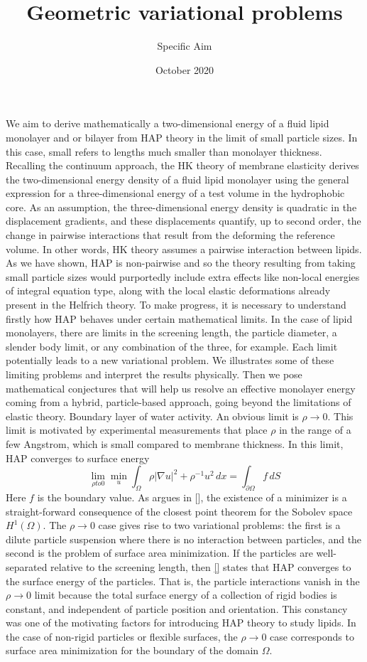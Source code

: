 \documentclass[12pt]{article}
\title{Geometric variational problems}
\author{Specific Aim}
\date{October 2020}
\begin{document}
\maketitle

We aim to derive mathematically a two-dimensional energy of a fluid lipid monolayer and or bilayer from HAP theory in the limit of small particle sizes. In this case, small refers to lengths much smaller than monolayer thickness. Recalling the continuum approach, the HK theory of membrane elasticity derives the two-dimensional energy density of a fluid lipid monolayer using the general expression for a three-dimensional energy of a test volume in the hydrophobic core. As an assumption, the three-dimensional energy density is quadratic in the displacement gradients, and these displacements quantify, up to second order, the change in pairwise interactions that result from the deforming the reference volume. In other words, HK theory assumes a pairwise interaction between lipids. As we have shown, HAP is non-pairwise and so the theory resulting from taking small particle sizes would purportedly include extra effects like non-local energies of integral equation type, along with the local elastic deformations already present in the Helfrich theory. 
To make progress, it is necessary to understand firstly how HAP behaves under certain mathematical limits. In the case of lipid monolayers, there are limits in the screening length, the particle diameter, a slender body limit, or any combination of the three, for example. Each limit potentially leads to a new variational problem. We illustrates some of these limiting problems and interpret the results physically. Then we pose mathematical conjectures that will help us resolve an effective monolayer energy coming from a hybrid, particle-based approach, going beyond the limitations of elastic theory.
Boundary layer of water activity. An obvious limit is $\rho \to 0$. This limit is motivated by experimental measurements that place $\rho$ in the range of a few Angstrom, which is small compared to membrane thickness. In this limit, HAP converges to surface energy 
\begin{equation}
\lim_{\rho to 0} \min_u \int_{\Omega} \rho |\nabla u|^2 + \rho^{-1} u^2 \,dx = \int_{\partial \Omega} f \,dS 
\end{equation}
Here $f$ is the boundary value. As argues in [], the existence of a minimizer is a straight-forward consequence of the closest point theorem for the Sobolev space $H^1(\Omega)$. 
The $\rho \to 0$ case gives rise to two variational problems: the first is a dilute particle suspension where there is no interaction between particles, and the second is the problem of surface area minimization. If the particles are well-separated relative to the screening length, then \eqref{} states that HAP converges to the surface energy of the particles. That is, the particle interactions vanish in the $\rho \to 0$ limit because the total surface energy of a collection of rigid bodies is constant, and independent of particle position and orientation. This constancy was one of the motivating factors for introducing HAP theory to study lipids. In the case of non-rigid particles or flexible surfaces, the $\rho \to 0$ case corresponds to surface area minimization for the boundary of the domain $\Omega$. 
\end{document}
